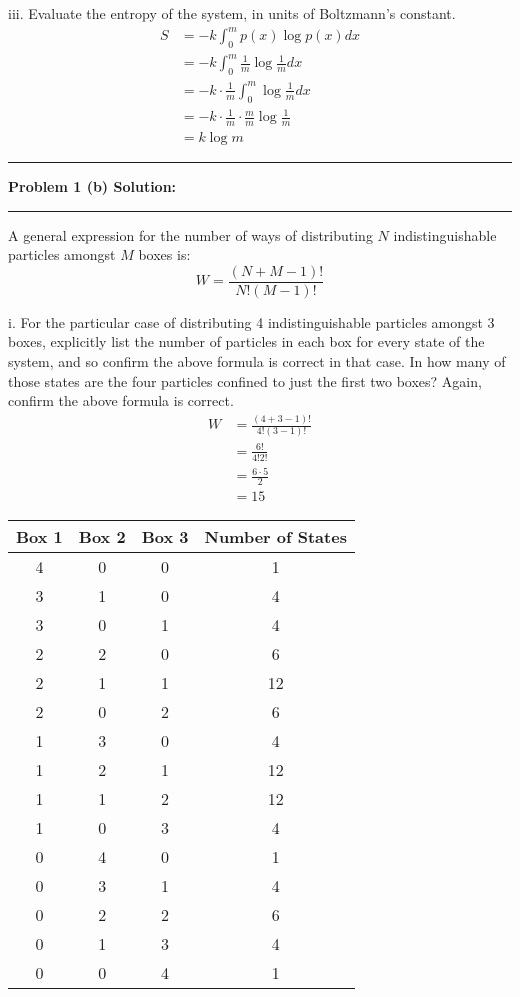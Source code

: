 \documentclass[11pt]{article}
\newcommand\question[2]{\vspace{.25in}\hrule\textbf{#1: #2}\vspace{.5em}\hrule\vspace{.10in}}
\begin{document}
iii. Evaluate the entropy of the system, in units of Boltzmann's constant.
\begin{align*}
    S &= -k\int_{0}^{m} p(x)\log p(x) dx \\
    &= -k\int_{0}^{m} \frac{1}{m}\log \frac{1}{m} dx \\
    &= -k\cdot \frac{1}{m}\int_{0}^{m} \log \frac{1}{m} dx \\
    &= -k\cdot \frac{1}{m}\cdot \frac{m}{m}\log \frac{1}{m} \\
    &= k\log m
\end{align*}
\question{Problem 1 (b) Solution}{}
A general expression for the number of ways of distributing $N$ indistinguishable
particles amongst $M$ boxes is:
\[W = \frac{(N+M-1)!}{N!(M-1)!}\]

i. For the particular case of distributing 4 indistinguishable particles amongst 3 boxes, explicitly list the number of particles in each box for every state of the system, and so confirm the above formula is correct in that case. In how many of those states are the four particles confined to just the first two boxes? Again, confirm the above formula is correct.
\begin{align*}
    W &= \frac{(4+3-1)!}{4!(3-1)!} \\
    &= \frac{6!}{4!2!} \\
    &= \frac{6\cdot 5}{2} \\
    &= 15
\end{align*}
\begin{center}
    \begin{tabular}{|c|c|c|c|}
        \hline
        Box 1 & Box 2 & Box 3 & Number of States \\
        \hline
        4 & 0 & 0 & 1 \\
        \hline
        3 & 1 & 0 & 4 \\
        \hline
        3 & 0 & 1 & 4 \\
        \hline
        2 & 2 & 0 & 6 \\
        \hline
        2 & 1 & 1 & 12 \\
        \hline
        2 & 0 & 2 & 6 \\
        \hline
        1 & 3 & 0 & 4 \\
        \hline
        1 & 2 & 1 & 12 \\
        \hline
        1 & 1 & 2 & 12 \\
        \hline
        1 & 0 & 3 & 4 \\
        \hline
        0 & 4 & 0 & 1 \\
        \hline
        0 & 3 & 1 & 4 \\
        \hline
        0 & 2 & 2 & 6 \\
        \hline
        0 & 1 & 3 & 4 \\
        \hline
        0 & 0 & 4 & 1 \\
        \hline
    \end{tabular}
\end{center}
\end{document}
